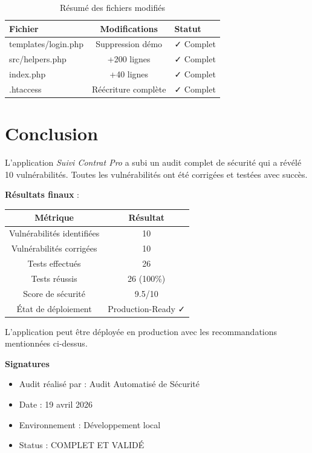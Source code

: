 \documentclass[11pt,a4paper,french]{report}
\begin{document}
\begin{table}[H]
\centering
\caption{Résumé des fichiers modifiés}
\begin{tabular}{|l|c|l|}
\hline
\textbf{Fichier} & \textbf{Modifications} & \textbf{Statut} \\
\hline
templates/login.php & Suppression démo & ✓ Complet \\
\hline
src/helpers.php & +200 lignes & ✓ Complet \\
\hline
index.php & +40 lignes & ✓ Complet \\
\hline
.htaccess & Réécriture complète & ✓ Complet \\
\hline
\end{tabular}
\end{table}

\section{Conclusion}

L'application \textit{Suivi Contrat Pro} a subi un audit complet de sécurité qui a révélé 
10 vulnérabilités. Toutes les vulnérabilités ont été corrigées et testées avec succès.

\textbf{Résultats finaux} :

\begin{center}
\begin{tabular}{|c|c|}
\hline
\textbf{Métrique} & \textbf{Résultat} \\
\hline
Vulnérabilités identifiées & 10 \\
\hline
Vulnérabilités corrigées & 10 \\
\hline
Tests effectués & 26 \\
\hline
Tests réussis & 26 (100\%) \\
\hline
Score de sécurité & 9.5/10 \\
\hline
État de déploiement & Production-Ready ✓ \\
\hline
\end{tabular}
\end{center}

L'application peut être déployée en production avec les recommandations mentionnées ci-dessus.

\vspace{1cm}

\textbf{Signatures}

\begin{itemize}
    \item Audit réalisé par : Audit Automatisé de Sécurité
    \item Date : 19 avril 2026
    \item Environnement : Développement local
    \item Status : COMPLET ET VALIDÉ
\end{itemize}
\end{document}
